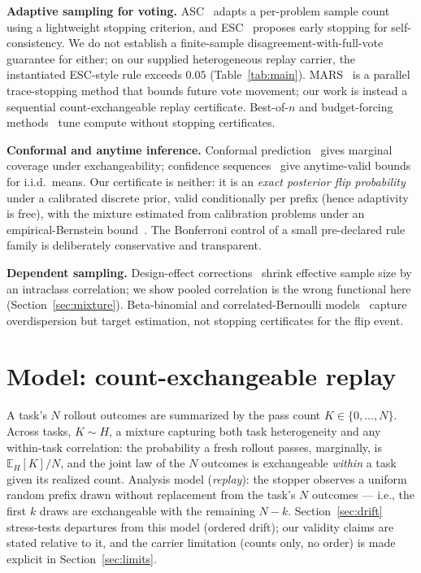 \documentclass{article}
\theoremstyle{definition}
\theoremstyle{remark}
\newcommand{\E}{\mathbb{E}}
\begin{document}
\textbf{Adaptive sampling for voting.} ASC~\citep{aggarwal2023asc} adapts a
per-problem sample count using a lightweight stopping criterion, and
ESC~\citep{li2024esc} proposes early stopping for self-consistency. We do not
establish a finite-sample disagreement-with-full-vote guarantee for either;
on our supplied heterogeneous replay carrier, the instantiated ESC-style rule
exceeds $0.05$ (Table~\ref{tab:main}). MARS~\citep{chen2026mars} is a
parallel trace-stopping method that bounds future vote movement; our work is
instead a sequential count-exchangeable replay certificate. Best-of-$n$ and budget-forcing
methods~\citep{snell2024scaling} tune compute without stopping certificates.

\textbf{Conformal and anytime inference.} Conformal
prediction~\citep{vovk2005algorithmic} gives marginal coverage under
exchangeability; confidence sequences~\citep{howard2021cs} give anytime-valid
bounds for i.i.d.\ means. Our certificate is neither: it is an \emph{exact
posterior flip probability} under a calibrated discrete prior, valid
conditionally per prefix (hence adaptivity is free), with the mixture
estimated from calibration problems under an empirical-Bernstein
bound~\citep{maurer2009eb}. The Bonferroni control of a small pre-declared
rule family is deliberately conservative and transparent.

\textbf{Dependent sampling.} Design-effect corrections~\citep{kish1965deff}
shrink effective sample size by an intraclass correlation; we show pooled
correlation is the wrong functional here (Section~\ref{sec:mixture}).
Beta-binomial and correlated-Bernoulli
models~\citep{skellam1948betabinomial} capture overdispersion but target
estimation, not stopping certificates for the flip event.

\section{Model: count-exchangeable replay}
\label{sec:model}

A task's $N$ rollout outcomes are summarized by the pass count
$K\in\{0,\dots,N\}$. Across tasks, $K\sim H$, a mixture capturing both
task heterogeneity and any within-task correlation: the probability a fresh
rollout passes, marginally, is $\E_H[K]/N$, and the joint law of the $N$
outcomes is exchangeable \emph{within} a task given its realized count.
Analysis model (\emph{replay}): the stopper observes a uniform random
prefix drawn without replacement from the task's $N$ outcomes --- i.e., the
first $k$ draws are exchangeable with the remaining $N-k$.
Section~\ref{sec:drift} stress-tests departures from this model (ordered
drift); our validity claims are stated relative to it, and the carrier
limitation (counts only, no order) is made explicit in
Section~\ref{sec:limits}.
\end{document}
